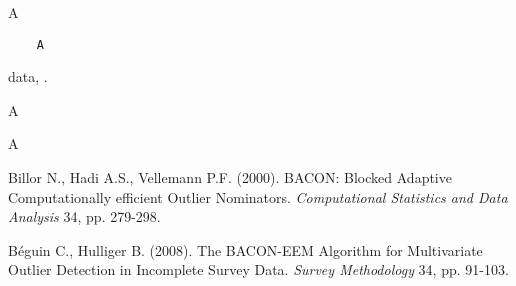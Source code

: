 \documentclass[a4paper,oneside,10pt,DIV=12]{scrreprt}
\begin{document}
\begin{Description}
	A
\end{Description}
\begin{Usage}
\begin{verbatim}
	A
\end{verbatim}
\end{Usage}
\begin{Arguments}
	\begin{ldescription}
		\item[\code{x}] data, .
	\end{ldescription}
\end{Arguments}
\begin{Details}
	A
\end{Details}
\begin{Value}
	A
\end{Value}
\begin{References}
Billor N., Hadi A.S., Vellemann P.F. (2000). BACON: Blocked Adaptive 
Computationally efficient Outlier Nominators. \textit{Computational Statistics
and Data Analysis} 34, pp. 279-298.

B{\'e}guin C., Hulliger B. (2008). The BACON-EEM Algorithm for Multivariate 
Outlier Detection in Incomplete Survey Data. \textit{Survey Methodology} 34, 
pp. 91-103. 
\end{References}
\end{document}
